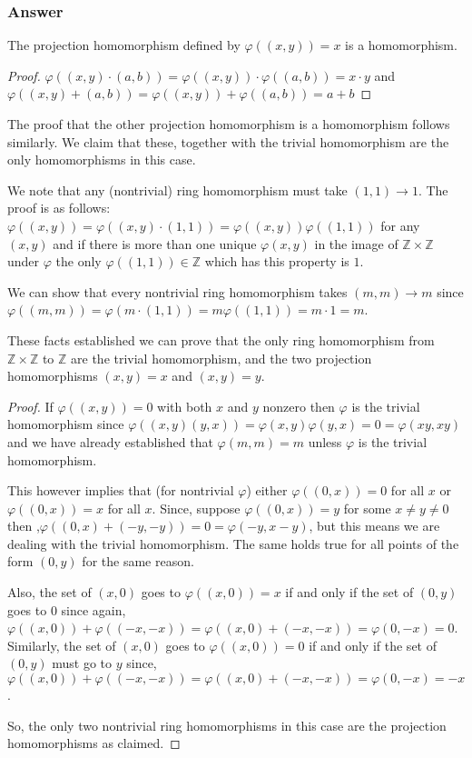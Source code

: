 \documentclass[12pt]{article}
\begin{document}
\subsubsection{Answer}

The projection homomorphism defined by $\varphi((x,y))=x$ is a homomorphism.
\begin{proof}
$\varphi((x,y)\cdot(a,b))=\varphi((x,y))\cdot\varphi((a,b))=x\cdot y$ and 
$\varphi((x,y)+(a,b))=\varphi((x,y))+\varphi((a,b))=a+b$
\end{proof}

The proof that the other projection homomorphism is a homomorphism follows similarly. We claim that these, together with the trivial homomorphism are the only homomorphisms in this case.

We note that  any (nontrivial) ring homomorphism must take $(1,1)\to1$. The proof is as follows: $\varphi((x,y))=\varphi{((x,y) \cdot (1,1))}=\varphi((x,y))\varphi((1,1))$ for any $(x,y)$ and if there is more than one unique $\varphi(x,y)$ in the image of $\mathbb{Z}\times\mathbb{Z} $ under $\varphi$ the only $\varphi((1,1)) \in \mathbb{Z}$ which has this property is $1$.

We can show that every nontrivial ring homomorphism takes $(m,m)\to m$ since $\varphi(
(m,m))=\varphi{(m\cdot(1,1))}=m\varphi{((1,1))}=m\cdot 1=m$.
 
 These facts established we can prove that the only ring homomorphism from $\mathbb{Z}\times \mathbb{Z}$ to $\mathbb{Z}$ are the trivial homomorphism, and the two projection homomorphisms $(x,y)=x$ and $(x,y)=y$. 
 
 \begin{proof}
If $\varphi{((x,y))}=0$ with both $x$ and $y$ nonzero then $\varphi$ is the trivial homomorphism since $\varphi((x,y)(y,x))=\varphi(x,y)\varphi(y,x)=0=\varphi(xy,xy)$ and we have already established that $\varphi(m,m)=m$ unless $\varphi$ is the trivial homomorphism. 

This however implies that (for nontrivial $\varphi$) either $\varphi((0,x))=0 $ for all $x$ or $\varphi((0,x))=x $ for all $x$. Since, suppose $\varphi((0,x))=y $ for some $x\neq y\neq 0$ then ,$\varphi((0,x)+(-y,-y))=0=\varphi(-y,x-y)$, but this means we are dealing with the trivial homomorphism. The same holds true for all points of the form $(0,y)$ for the same reason.

Also, the set of $(x,0)$ goes to $\varphi((x,0))=x$ if and only if the set of $(0,y)$ goes to $0$ since again, $\varphi((x,0))+\varphi((-x,-x))=\varphi((x,0)+(-x,-x))=\varphi(0,-x)=0$. Similarly, the set of $(x,0)$ goes to $\varphi((x,0))=0$ if and only if the set of $(0,y)$ must go to $y$ since, $\varphi((x,0))+\varphi((-x,-x))=\varphi((x,0)+(-x,-x))=\varphi(0,-x)=-x$.

So, the only two nontrivial ring homomorphisms in this case are the projection homomorphisms as claimed.\end{proof}
  
\end{document}
